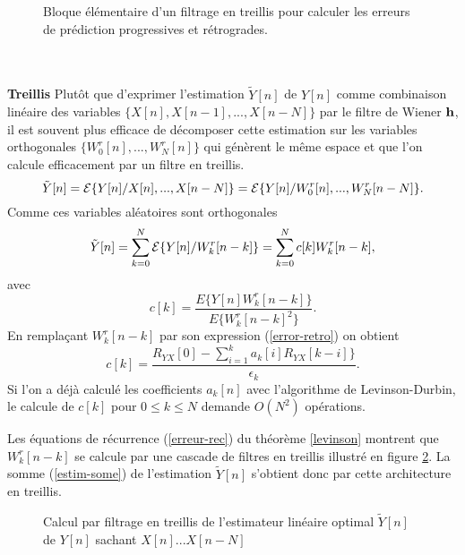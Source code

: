 \begin{figure}[bhtp]
\vspace{5cm}
\caption{Bloque \'el\'ementaire d'un filtrage 
en treillis pour calculer les erreurs de pr\'ediction progressives
et r\'etrogrades.}
\label{bloque-treillis}
\end{figure}
\\
\\
{\bf Treillis}
Plut\^ot que d'exprimer l'estimation $\tilde Y [n]$ 
de $Y[n]$ comme combinaison
lin\'eaire des variables 
$\{X [n] , X[n-1] , ..., X[n-N] \}$ par le
filtre de Wiener ${\bf h}$, il est souvent
plus efficace de d\'ecomposer cette estimation sur les
variables orthogonales
$\{ W^r_0[n], ..., W_N^r[n] \}$ qui g\'en\`erent le
m\^eme espace et que l'on
calcule efficacement par un filtre en treillis.
\[
\tilde Y [n] = {\cal E} \{ Y[n] {/} X[n], ..., X[n-N] \} = 
{\cal E} \{ Y[n] {/} W^r_0[n], ..., W_N^r[n-N] \} .
\]
Comme ces variables al\'eatoires sont orthogonales
\begin{equation}
\label{estim-some}
\tilde Y [n] = 
\sum_{k=0}^N {\cal E} \{ Y[n] {/} W_k^r[n-k] \} =
\sum_{k=0}^N c[k] W_k^r[n-k] ,
\end{equation}
avec
\[
c[k] = \frac {E \{Y[n]  W_k^r[n-k] \} } 
{E \{ W_k^r[n-k]^2 \} } .
\]
En rempla\c{c}ant $W_k^r[n-k]$ par son expression (\ref{error-retro})
on obtient
\[
c[k] = \frac {R_{YX} [0] - \sum_{i=1}^k a_k[i] R_{YX} [k-i]\} } 
{\epsilon_k } .
\]
Si l'on a d\'ej\`a calcul\'e les coefficients $a_k[n]$ avec
l'algorithme de Levinson-Durbin, le
calcule de $c[k]$ pour $0 \leq k \leq N$ demande
$O(N^2)$ op\'erations.

Les \'equations de r\'ecurrence (\ref{erreur-rec}) 
du th\'eor\`eme \ref{levinson} montrent
que $W_k^r[n-k]$ se calcule par une cascade
de filtres en treillis illustr\'e en figure \ref{fitre-treillis}.
La somme (\ref{estim-some}) de l'estimation $\tilde Y [n]$ 
s'obtient donc par cette architecture en treillis.\\

\begin{figure}[bhtp]
\vspace{8cm}
\caption{Calcul par filtrage en treillis de
l'estimateur lin\'eaire optimal $\tilde Y[n]$ de $Y[n]$ sachant
$X[n] ... X[n-N]$}
\label{fitre-treillis}
\end{figure}


